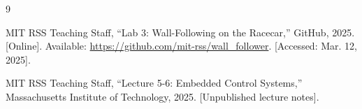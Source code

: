 \documentclass{article}
\begin{document}
\begin{thebibliography}{9}

MIT RSS Teaching Staff, ``Lab 3: Wall-Following on the Racecar,'' GitHub, 2025. [Online]. Available: \url{https://github.com/mit-rss/wall_follower}. [Accessed: Mar. 12, 2025].

MIT RSS Teaching Staff, ``Lecture 5-6: Embedded Control Systems,'' Massachusetts Institute of Technology, 2025. [Unpublished lecture notes].

\end{thebibliography}
\end{document}
